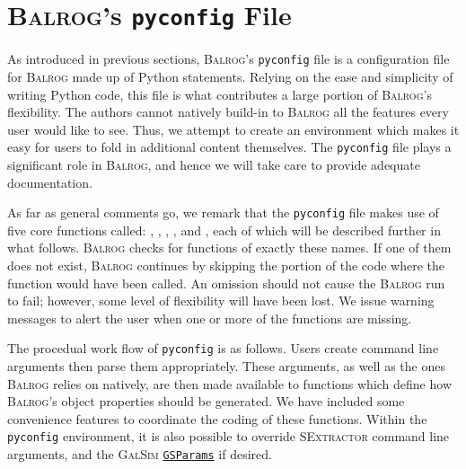 \documentclass[11pt]{book}
\newcommand{\codett}[1]{\texttt{#1}}
\newcommand{\py}{Python}
\newcommand{\pyconfig}{\codett{pyconfig}}
\newcommand{\galsim}{\textsc{GalSim}}
\newcommand{\balrog}{\textsc{Balrog}}
\newcommand{\sex}{\textsc{SExtractor}}
\begin{document}
\begin{table}[h]
\begin{tabular}{l l l}
\end{tabular}
\end{table}

\chapter{\balrog{}'s \texttt{pyconfig} File}
\label{sec:pyconfig}

As introduced in previous sections, \balrog{}'s \pyconfig{} file is a configuration file for \balrog{} made up of \py{} statements.
Relying on the ease and simplicity of writing \py{} code, this file is what contributes a large portion of \balrog{}'s flexibility.
The authors cannot natively build-in to \balrog{} all the features every user would like to see.
Thus, we attempt to create an environment which makes it easy for users to fold in additional content themselves.
The \pyconfig{} file plays a significant role in \balrog{}, and hence we will take care to provide adequate documentation.

As far as general comments go, we remark that the \pyconfig{} file makes use of five core functions called:
\argsfunc, \parsefunc, \simfunc,  \gspfunc, and \sexfunc, each of which will be described further in what follows.
\balrog{} checks for functions of exactly these names.
If one of them does not exist, \balrog{} continues by skipping the portion of the code where the function would have been called.
An omission should not cause the \balrog{} run to fail; however, some level of flexibility will have been lost.
We issue warning messages to alert the user when one or more of the functions are missing.


The procedual work flow of \pyconfig{} is as follows.
Users create command line arguments then parse them appropriately.
These arguments, as well as the ones \balrog{} relies on natively, are then made available to 
functions which define how \balrog{}'s object properties should be generated.
We have included some convenience features to coordinate the coding of these functions. 
Within the \pyconfig{} environment, it is also possible to override \sex{} command line arguments, 
and the \galsim{} \href{http://galsim-developers.github.io/GalSim/structgalsim\_1\_1\_g\_s\_params.html}{\texttt{GSParams}} if desired.
\end{document}
